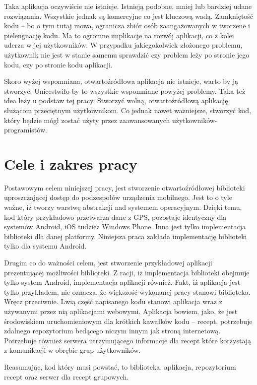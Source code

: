 \documentclass[11pt,a4paper,polish,thesis]{dcsbook}
\begin{document}
Taka aplikacja oczywiście nie istnieje. Istnieją podobne, mniej lub bardziej udane rozwiązania. Wszystkie jednak są komercyjne co jest kluczową wadą. Zamkniętość kodu
-- bo o tym tutaj mowa, ogranicza zbiór osób zaangażowanych w tworzene i pielengnację kodu. Ma to ogromne implikacje na rozwój aplikacji, co z kolei uderza w jej
użytkowników. W przypadku jakiegokolwiek złożonego problemu, użytkownik nie jest w stanie samemu sprawdzić czy problem leży po stronie jego kodu, czy po
stronie kodu aplikacji.

Skoro wyżej wspomniana, otwartoźródłowa aplikacja nie istnieje, warto by ją stworzyć. Unicestwiło by to wszystkie wspomniane powyżej problemy. Taka też idea leży u
podstaw tej pracy. Stworzyć wolną, otwartoźródłową aplikację służącom przeciętnym użytkownikom. Co jednak nawet ważniejsze, stworzyć kod, który będzie mógł zostać
użyty przez zaawansowanych użytkowników-programistów.

\section{Cele i zakres pracy}
Postawowym celem niniejszej pracy, jest stworzenie otwartoźródłowej biblioteki uproszczającej dostęp do podzespołów urządzenia mobilnego. Jest to o tyle ważne, iż
tworzy warstwę abstrakcji nad systemem operacyjnym. Dzięki temu, kod który przykładowo przetwarza dane z GPS, pozostaje identyczny dla systemów Android, iOS tudzież
Windows Phone. Inna jest tylko implementacja biblioteki dla danej platformy. Niniejsza praca zakłada implementację biblioteki tylko dla systemu Android.

Drugim co do ważności celem, jest stworzenie przykładowej aplikacji prezentującej możliwości biblioteki. Z racji, iż implementacja biblioteki obejmuje tylko system
Android, implementacja aplikacji również. Fakt, iż aplikacja jest tylko przykładem, nie oznacza, że większość wykonanej pracy stanowi biblioteka. Wręcz przeciwnie.
Lwią część napisanego kodu stanowi aplikacja wraz z używanymi przez nią aplikacjami webowymi. Aplikacja bowiem, jako, że jest środowiskiem uruchomieniowym dla
krótkich kawałków kodu -- recept, potrzebuje zdalnego repozytorium bedącego niczym innym jak stroną internetową. Potrzebuje również serwera utrzymującego informacje
dla recept które korzystają z komunikacji w obrębie grup użytkowników. %

Reasumując, kod który musi powstać, to biblioteka, aplikacja, repozytorium recept oraz serwer dla recept grupowych. %
\end{document}
